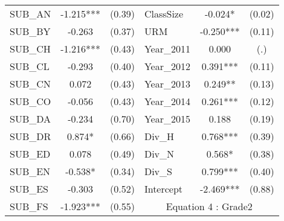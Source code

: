 \begin{table}[htb]
\begin{threeparttable}
\begin{tabular}{l c c|l c c}
    SUB\_AN                                      & -1.215***                  & (0.39)               & ClassSize           & -0.024*                & (0.02)               \\
    SUB\_BY                                      & -0.263                     & (0.37)               & URM                 & -0.250***              & (0.11)               \\
    SUB\_CH                                      & -1.216***                  & (0.43)               & Year\_2011               & 0.000                  & (.)                  \\
    SUB\_CL                                      & -0.293                     & (0.40)               & Year\_2012               & 0.391***               & (0.11)               \\
    SUB\_CN                                      & 0.072                      & (0.43)               & Year\_2013               & 0.249**                & (0.13)               \\
    SUB\_CO                                      & -0.056                     & (0.43)               & Year\_2014               & 0.261***               & (0.12)               \\
    SUB\_DA                                      & -0.234                     & (0.70)               & Year\_2015               & 0.188                  & (0.19)               \\
    SUB\_DR                                      & 0.874*                     & (0.66)               & Div\_H              & 0.768***               & (0.39)               \\
    SUB\_ED                                      & 0.078                      & (0.49)               & Div\_N              & 0.568*                 & (0.38)               \\
    SUB\_EN                                      & -0.538*                    & (0.34)               & Div\_S              & 0.799***               & (0.40)               \\
    SUB\_ES                                      & -0.303                     & (0.52)               & Intercept           & -2.469***              & (0.88)               \\
    \cline{4-6}
    SUB\_FS                                      & -1.923***                  & (0.55)               & \multicolumn{3}{c}{Equation 4 : Grade2}                             \\

\end{tabular}
\end{threeparttable}
\end{table}
